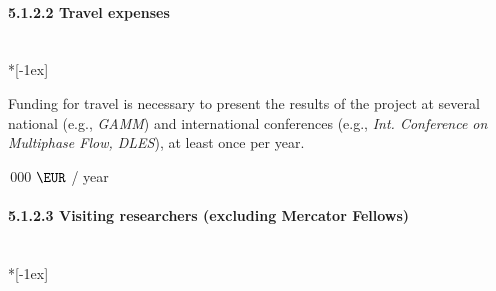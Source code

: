 \documentclass[11pt,a4paper,twoside]{scrartcl}
\begin{document}
\paragraph{5.1.2.2 Travel expenses}~\\*[-1ex]
\label{sec:travcost}

Funding for travel is necessary to present the results of the project
at several national (e.g., \emph{GAMM}) and international conferences
(e.g., \emph{Int. Conference on Multiphase Flow, DLES}), at least once
per year.

  \qquad {}\,000 $\EUR$ / year \\

%
%
%
%
% 
%
%
%
\paragraph{5.1.2.3 Visiting researchers (excluding Mercator 
Fellows)}~\\*[-1ex]
\end{document}
